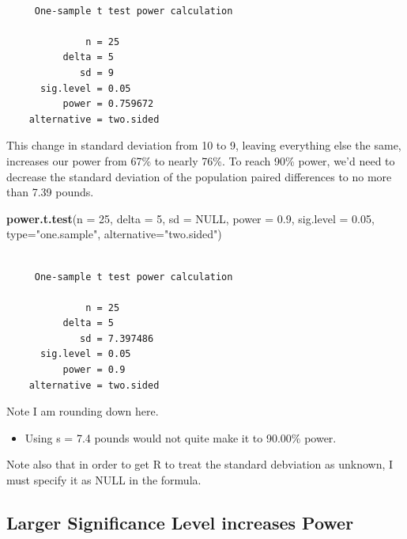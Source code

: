 \documentclass[
]{book}
\newenvironment{Shaded}{\begin{snugshade}}{\end{snugshade}}
\newcommand{\DataTypeTok}[1]{\textcolor[rgb]{0.13,0.29,0.53}{#1}}
\newcommand{\DecValTok}[1]{\textcolor[rgb]{0.00,0.00,0.81}{#1}}
\newcommand{\FloatTok}[1]{\textcolor[rgb]{0.00,0.00,0.81}{#1}}
\newcommand{\KeywordTok}[1]{\textcolor[rgb]{0.13,0.29,0.53}{\textbf{#1}}}
\newcommand{\NormalTok}[1]{#1}
\newcommand{\OtherTok}[1]{\textcolor[rgb]{0.56,0.35,0.01}{#1}}
\newcommand{\StringTok}[1]{\textcolor[rgb]{0.31,0.60,0.02}{#1}}
\providecommand{\tightlist}{%
  \setlength{\itemsep}{0pt}\setlength{\parskip}{0pt}}
\begin{document}
\begin{verbatim}

     One-sample t test power calculation 

              n = 25
          delta = 5
             sd = 9
      sig.level = 0.05
          power = 0.759672
    alternative = two.sided
\end{verbatim}

This change in standard deviation from 10 to 9, leaving everything else the same, increases our power from 67\% to nearly 76\%. To reach 90\% power, we'd need to decrease the standard deviation of the population paired differences to no more than 7.39 pounds.

\begin{Shaded}
\begin{Highlighting}[]
\KeywordTok{power.t.test}\NormalTok{(}\DataTypeTok{n =} \DecValTok{25}\NormalTok{, }\DataTypeTok{delta =} \DecValTok{5}\NormalTok{, }\DataTypeTok{sd =} \OtherTok{NULL}\NormalTok{, }\DataTypeTok{power =} \FloatTok{0.9}\NormalTok{, }\DataTypeTok{sig.level =} \FloatTok{0.05}\NormalTok{, }
             \DataTypeTok{type=}\StringTok{"one.sample"}\NormalTok{, }\DataTypeTok{alternative=}\StringTok{"two.sided"}\NormalTok{)}
\end{Highlighting}
\end{Shaded}

\begin{verbatim}

     One-sample t test power calculation 

              n = 25
          delta = 5
             sd = 7.397486
      sig.level = 0.05
          power = 0.9
    alternative = two.sided
\end{verbatim}

Note I am rounding down here.

\begin{itemize}
\tightlist
\item
  Using s = 7.4 pounds would not quite make it to 90.00\% power.
\end{itemize}

Note also that in order to get R to treat the standard debviation as unknown, I must specify it as NULL in the formula.

\hypertarget{larger-significance-level-increases-power}{%
\subsection{Larger Significance Level increases Power}\label{larger-significance-level-increases-power}}
\end{document}
